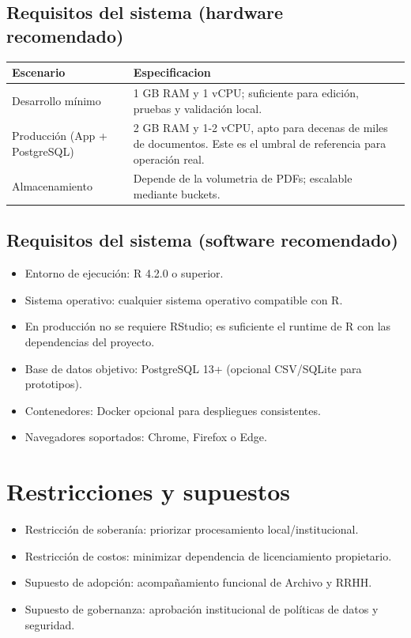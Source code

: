 \subsection{Requisitos del sistema (hardware recomendado)}
\begin{longtable}{p{} p{}}
\toprule
\textbf{Escenario} & \textbf{Especificacion} \\
\midrule
Desarrollo mínimo & 1 GB RAM y 1 vCPU; suficiente para edición, pruebas y validación local. \\
Producción (App + PostgreSQL) & 2 GB RAM y 1-2 vCPU, apto para decenas de miles de documentos. Este es el umbral de referencia para operación real. \\
Almacenamiento & Depende de la volumetria de PDFs; escalable mediante buckets. \\
\bottomrule
\end{longtable}

\subsection{Requisitos del sistema (software recomendado)}
\begin{itemize}
  \item Entorno de ejecución: R 4.2.0 o superior.
  \item Sistema operativo: cualquier sistema operativo compatible con R.
  \item En producción no se requiere RStudio; es suficiente el runtime de R con las dependencias del proyecto.
  \item Base de datos objetivo: PostgreSQL 13+ (opcional CSV/SQLite para prototipos).
  \item Contenedores: Docker opcional para despliegues consistentes.
  \item Navegadores soportados: Chrome, Firefox o Edge.
\end{itemize}

\section{Restricciones y supuestos}
\begin{itemize}
  \item Restricción de soberanía: priorizar procesamiento local/institucional.
  \item Restricción de costos: minimizar dependencia de licenciamiento propietario.
  \item Supuesto de adopción: acompañamiento funcional de Archivo y RRHH.
  \item Supuesto de gobernanza: aprobación institucional de políticas de datos y seguridad.
\end{itemize}

